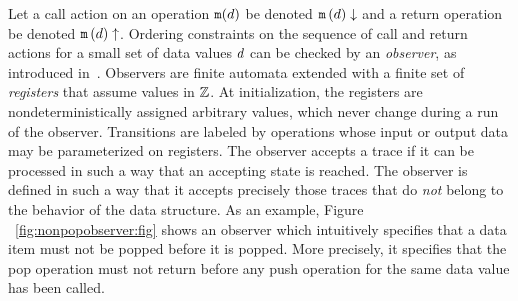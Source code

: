 Let a call action on an operation ${\tt m}(d)$ be denoted
${\tt m}\left(d\right)\downarrow$ and a return operation be denoted
${\tt m}\left(d\right)\uparrow$. Ordering constraints on the sequence of
call and return actions for a small set of data values $d$ can be
checked by an {\em observer},
as introduced in~\cite{AHHR:integrated}. 
%
Observers are
finite automata extended with a finite set of {\em registers}
that assume values in ${\mathbb Z}$. 
%
At initialization,
the registers are nondeterministically
assigned arbitrary values, which never change
during a run of the observer. 
%
Transitions are labeled by 
operations whose input or output data may be parameterized on registers.
%
%
The observer accepts a trace if it can  be processed in such a way that
an accepting state is reached.
%
The observer is defined in such a way that it accepts precisely those
traces that do {\em not} belong to the behavior
of the data structure.
As an example, Figure ~\ref{fig:nonpopobserver:fig} shows an observer which intuitively specifies that 
a data item must not be popped before it is popped. More precisely, it
specifies that the pop operation must not return before any push operation
for the same data value has been called.

